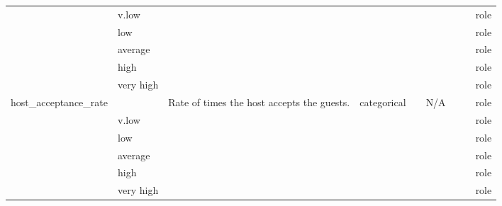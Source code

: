 \begin{center}
\begin{longtable}{@{}lllllllll@{}}
                            & v.low                       &                                   &             &                &                             &                     &         & role \\
                            & low                         &                                   &             &                &                             &                     &         & role \\
                            & average                     &                                   &             &                &                             &                     &         & role \\
                            & high                        &                                   &             &                &                             &                     &         & role \\
                            & very high                   &                                   &             &                &                             &                     &         & role \\
host\_acceptance\_rate      &                             & \multirow{5}{15ex}{Rate of times the host accepts the guests.} & categorical &                & N/A                         &                     &         & role \\
                            & v.low                       &                                   &             &                &                             &                     &         & role \\
                            & low                         &                                   &             &                &                             &                     &         & role \\
                            & average                     &                                   &             &                &                             &                     &         & role \\
                            & high                        &                                   &             &                &                             &                     &         & role \\
                            & very high                   &                                   &             &                &                             &                     &         & role \\

\end{longtable}
\end{center}

